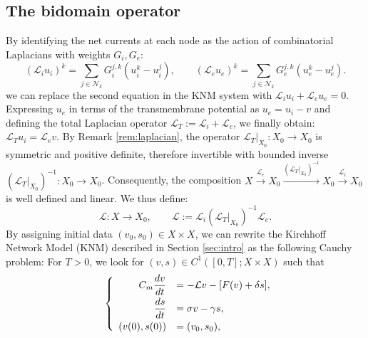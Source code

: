\documentclass[a4paper,11pt]{article}
\theoremstyle{definition}
\numberwithin{equation}{section}
\begin{document}
\subsection{The bidomain operator}
By identifying the net currents at each node as the action of combinatorial Laplacians with weights $G_i,G_e$:
\begin{equation}
	\label{eq:graph_laplacians}
	(\mathcal{L}_{i}u_{i})^{k} = \sum_{j \in \mathcal{N}_{k}}G_{i}^{j,k} (u_{i}^{k}-u_{i}^{j}),\qquad(\mathcal{L}_{e}u_{e})^{k} = \sum_{j \in \mathcal{N}_{k}}G_{e}^{j,k} (u_{e}^{k}-u_{e}^{j}).
\end{equation}
we can replace the second equation in the KNM system with $\mathcal{L}_i u_i + \mathcal{L}_e u_e = 0$. Expressing $u_e$ in terms of the transmembrane potential as $u_e = u_i - v$ and
defining the total Laplacian operator $\mathcal{L}_T := \mathcal{L}_i + \mathcal{L}_e$, we finally obtain:  $\mathcal{L}_T u_i = \mathcal{L}_e v$. By Remark \ref{rem:laplacian},  the operator $\mathcal{L}_T|_{X_0} : X_0 \to X_0$ is symmetric and positive definite, therefore invertible with bounded inverse \((\mathcal{L}_T|_{X_0})^{-1}: X_0 \to X_0\).  Consequently, the composition
\(
X \xrightarrow{\mathcal{L}_e} X_0 \xrightarrow{(\mathcal{L}_T|_{X_0})^{-1}} X_0 \xrightarrow{\mathcal{L}_i} X_0
\)
is well defined and linear. We thus define:
\begin{equation}
	\label{eq:operator_L}
	\mathcal{L}:X \to X_0,\qquad  \mathcal{L} := \mathcal{L}_i (\mathcal{L}_T|_{X_0})^{-1}\mathcal{L}_e.
\end{equation}	 
By assigning initial data $(v_0,s_0)\in X \times X$, we can rewrite the Kirchhoff Network Model (KNM) described in Section \ref{sec:intro} as the following Cauchy problem: For $T>0$, we look for $(v,s)\in C^1([0,T];X \times X)$ such that
\begin{equation}
	\label{eq:KNM_reformulated}
	\quad \left\{
	\begin{array}{rl}
		C_m\dfrac{dv}{dt} &= - \mathcal{L}v - [F(v) + \delta s],\vspace{0.1cm}\\
		\dfrac{ds}{dt} &= \sigma v - \gamma s,\vspace{0.1cm}\\
		(v(0),s(0)) & = (v_0,s_0),
	\end{array}
	\right.
\end{equation}
\end{document}
